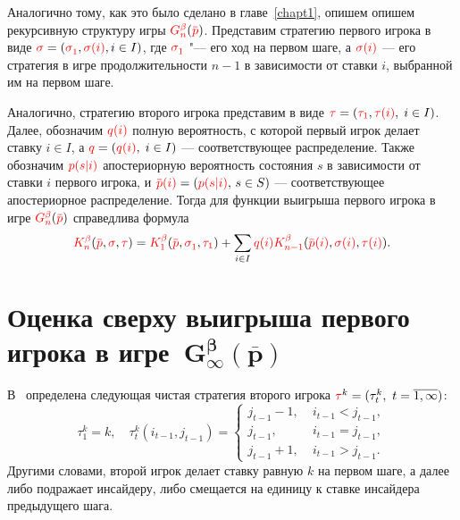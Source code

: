 {Аналогично тому, как это было сделано в главе~\ref{chapt1}, опишем опишем рекурсивную структуру игры $\theG{n}(\pd)$.
Представим стратегию первого игрока в виде $\sigmar = (\sigmas{1}, \sigmara{i}, i \in I)$, где $\sigmas{1}$ "--- его ход на первом шаге, а $\textcolor{red}{\sigma(i)}$ --- его стратегия в игре продолжительности $n-1$ в зависимости от ставки $i$, выбранной им на первом шаге.

Аналогично, стратегию второго игрока представим в виде $\textcolor{red}{\tau} = (\textcolor{red}{\tau_{1}}, \textcolor{red}{\tau(i)}, \; i \in I)$.
%
Далее, обозначим $\textcolor{red}{q(i)}$ полную вероятность, с которой первый игрок делает ставку $i \in I$, а $\textcolor{red}{q} = (\textcolor{red}{q(i)}, \; i \in I)$ --- соответствующее распределение.
Также обозначим $\textcolor{red}{p(s|i)}$ апостериорную вероятность состояния $s$ в зависимости от ставки $i$ первого игрока, и $\pad{i} = (\pac{s}{i}, \, s \in S)$ --- соответствующее апостериорное распределение.
Тогда для функции выигрыша первого игрока в игре $\theG{n}(\pd)$ справедлива формула
\begin{equation*}
  \K{n}(\pd, \sigmar, \taur) =
  \K{1}(\pd, \sigmas{1}, \taus{1}) +
  \sum_{i \in I} \qc{i} \K{n-1}(\pad{i}, \sigmara{i}, \taura{i}).
\end{equation*}

\section{Оценка сверху выигрыша первого игрока в игре~$\mathbf{G^\beta_\infty(\overline{p})}$}
\label{ch2:sec:upper-bound}

В~\cite{domansky11} определена следующая чистая стратегия второго игрока $\textcolor{red}{\tau}^k = (\tau^k_t,\ t = \overline{1, \infty})$:
\begin{equation*}
  \tau^k_1 = k, \quad
  \tau^k_t(i_{t-1}, j_{t-1}) = \begin{cases}
    j_{t-1} - 1, &\; i_{t-1} < j_{t-1},\\
    j_{t-1}, &\; i_{t-1} = j_{t-1},\\
    j_{t-1}+1, &\; i_{t-1} > j_{t-1}.
  \end{cases}
\end{equation*}
Другими словами, второй игрок делает ставку равную $k$ на первом шаге, а далее либо подражает инсайдеру, либо смещается на единицу к ставке инсайдера предыдущего шага.

}
